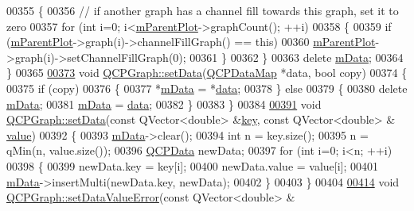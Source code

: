 \begin{DoxyCode}
00355   \{
00356     \textcolor{comment}{// if another graph has a channel fill towards this graph, set it to zero}
00357     \textcolor{keywordflow}{for} (\textcolor{keywordtype}{int} i=0; i<\hyperlink{a00044_aa2a528433e44db02b8aef23c1f9f90ed}{mParentPlot}->graphCount(); ++i)
00358     \{
00359       \textcolor{keywordflow}{if} (\hyperlink{a00044_aa2a528433e44db02b8aef23c1f9f90ed}{mParentPlot}->graph(i)->channelFillGraph() == \textcolor{keyword}{this})
00360         \hyperlink{a00044_aa2a528433e44db02b8aef23c1f9f90ed}{mParentPlot}->graph(i)->setChannelFillGraph(0);
00361     \}
00362   \}
00363   \textcolor{keyword}{delete} \hyperlink{a00031_a8457c840f69a0ac49f61d30a509c5d08}{mData};
00364 \}
00365 
\hypertarget{a00115_source_l00373}{}\hyperlink{a00031_a1df2fd710545c8ba3b2c99a39a27bf8b}{00373} \textcolor{keywordtype}{void} \hyperlink{a00031_a1df2fd710545c8ba3b2c99a39a27bf8b}{QCPGraph::setData}(\hyperlink{a00116_a84a9c4a4c2216ccfdcb5f3067cda76e3}{QCPDataMap} *data, \textcolor{keywordtype}{bool} copy)
00374 \{
00375   \textcolor{keywordflow}{if} (copy)
00376   \{
00377     *\hyperlink{a00031_a8457c840f69a0ac49f61d30a509c5d08}{mData} = *\hyperlink{a00031_a8f4c17d993df4759c7426db45b33fbc0}{data};
00378   \} \textcolor{keywordflow}{else}
00379   \{
00380     \textcolor{keyword}{delete} \hyperlink{a00031_a8457c840f69a0ac49f61d30a509c5d08}{mData};
00381     \hyperlink{a00031_a8457c840f69a0ac49f61d30a509c5d08}{mData} = \hyperlink{a00031_a8f4c17d993df4759c7426db45b33fbc0}{data};
00382   \}
00383 \}
00384 
\hypertarget{a00115_source_l00391}{}\hyperlink{a00031_a4c55d8ac13bfa42c8c93747820891a76}{00391} \textcolor{keywordtype}{void} \hyperlink{a00031_a1df2fd710545c8ba3b2c99a39a27bf8b}{QCPGraph::setData}(\textcolor{keyword}{const} QVector<double> &\hyperlink{a00116_a94bb892c30911cd62cba0707a5395be4}{key}, \textcolor{keyword}{const} QVector<double> &
      \hyperlink{a00116_aee90379adb0307effb138f4871edbc5c}{value})
00392 \{
00393   \hyperlink{a00031_a8457c840f69a0ac49f61d30a509c5d08}{mData}->clear();
00394   \textcolor{keywordtype}{int} n = key.size();
00395   n = qMin(n, value.size());
00396   \hyperlink{a00030_d2/d94/a00184}{QCPData} newData;
00397   \textcolor{keywordflow}{for} (\textcolor{keywordtype}{int} i=0; i<n; ++i)
00398   \{
00399     newData.key = key[i];
00400     newData.value = value[i];
00401     \hyperlink{a00031_a8457c840f69a0ac49f61d30a509c5d08}{mData}->insertMulti(newData.key, newData);
00402   \}
00403 \}
00404 
\hypertarget{a00115_source_l00414}{}\hyperlink{a00031_acba6296eadcb36b93267628b8dae3de5}{00414} \textcolor{keywordtype}{void} \hyperlink{a00031_acba6296eadcb36b93267628b8dae3de5}{QCPGraph::setDataValueError}(\textcolor{keyword}{const} QVector<double> &

\end{DoxyCode}
